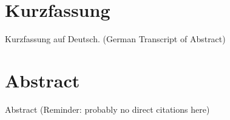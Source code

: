 
{%
	\chapter*{Kurzfassung}
	
	Kurzfassung auf Deutsch.  (German Transcript of Abstract)
}

{%
	\chapter*{Abstract}
	
	Abstract (Reminder: probably no direct citations here)
}
